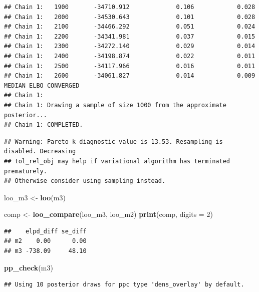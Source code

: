 \documentclass[
]{article}
\newenvironment{Shaded}{\begin{snugshade}}{\end{snugshade}}
\newcommand{\AttributeTok}[1]{\textcolor[rgb]{0.13,0.29,0.53}{#1}}
\newcommand{\DecValTok}[1]{\textcolor[rgb]{0.00,0.00,0.81}{#1}}
\newcommand{\FunctionTok}[1]{\textcolor[rgb]{0.13,0.29,0.53}{\textbf{#1}}}
\newcommand{\NormalTok}[1]{#1}
\newcommand{\OtherTok}[1]{\textcolor[rgb]{0.56,0.35,0.01}{#1}}
\begin{document}
\begin{verbatim}
## Chain 1:   1900       -34710.912             0.106            0.028
## Chain 1:   2000       -34530.643             0.101            0.028
## Chain 1:   2100       -34466.292             0.051            0.024
## Chain 1:   2200       -34341.981             0.037            0.015
## Chain 1:   2300       -34272.140             0.029            0.014
## Chain 1:   2400       -34198.874             0.022            0.011
## Chain 1:   2500       -34117.966             0.016            0.011
## Chain 1:   2600       -34061.827             0.014            0.009   MEDIAN ELBO CONVERGED
## Chain 1: 
## Chain 1: Drawing a sample of size 1000 from the approximate posterior... 
## Chain 1: COMPLETED.
\end{verbatim}

\begin{verbatim}
## Warning: Pareto k diagnostic value is 13.53. Resampling is disabled. Decreasing
## tol_rel_obj may help if variational algorithm has terminated prematurely.
## Otherwise consider using sampling instead.
\end{verbatim}

\begin{Shaded}
\begin{Highlighting}[]
\NormalTok{loo\_m3 }\OtherTok{\textless{}{-}} \FunctionTok{loo}\NormalTok{(m3)}

\NormalTok{comp }\OtherTok{\textless{}{-}} \FunctionTok{loo\_compare}\NormalTok{(loo\_m3, loo\_m2)}
\FunctionTok{print}\NormalTok{(comp, }\AttributeTok{digits =} \DecValTok{2}\NormalTok{)}
\end{Highlighting}
\end{Shaded}

\begin{verbatim}
##    elpd_diff se_diff
## m2    0.00      0.00
## m3 -738.09     48.10
\end{verbatim}

\begin{Shaded}
\begin{Highlighting}[]
\FunctionTok{pp\_check}\NormalTok{(m3)}
\end{Highlighting}
\end{Shaded}

\begin{verbatim}
## Using 10 posterior draws for ppc type 'dens_overlay' by default.
\end{verbatim}
\end{document}
